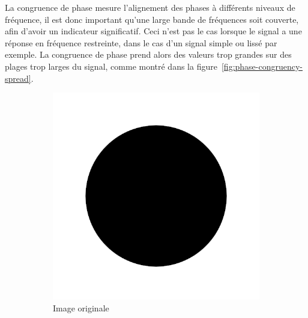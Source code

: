 La congruence de phase mesure l'alignement des phases à différents niveaux de fréquence, il est donc important qu'une large bande de fréquences soit couverte, afin d'avoir un indicateur significatif. Ceci n'est pas le cas lorsque le signal a une réponse en fréquence restreinte, dans le cas d'un signal simple ou lissé par exemple. La congruence de phase prend alors des valeurs trop grandes sur des plages trop larges du signal, comme montré dans la figure~\ref{fig:phase-congruency-spread}.

\begin{figure}
    \centering
    \begin{subfigure}{.22\textwidth}
        \centering
        \includegraphics[width=\textwidth]{contenu/resources/images/disk}
        \caption{Image originale\\}
    \end{subfigure}
    \begin{subfigure}{.22\textwidth}
        \centering

\end{subfigure}
\end{figure}
